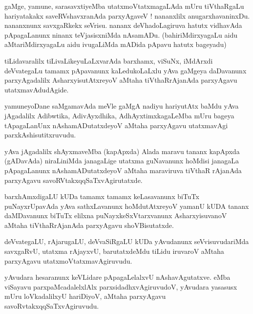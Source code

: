 \documentclass{article}
\begin{document}
\begin{mn}%
gaMge, yamune, sarasavxtiyeMba utatxmoVtatxmagaLAda mUru tiVthaRgaLu hariyatakakx 
saveRVshavxranAda parxyAgaveV ! nananxlilx anugarxhavaninxDu. nananxnunx savxgaRkekx 
seVrisu. nananx deVhadoLagiruva hatutx vidhavAda pApagaLanunx ninanx teVjasisxniMda 
nAsamADu. (bahiriMdirxyagaLu aidu aMtariMdirxyagaLu aidu ivugaLiMda mADida pApavu hatutx 
bageyadu)
\end{mn}

\begin{mn}%
tiLidavaralilx tiLivaLikeyuLaLxvarAda barxhamx, viSuNx, iMdArxdi deVvategaLu tamamx 
pApavanunx kaLedukoLaLxlu yAva gaMgeya daDavanunx parxyAgadalilx AsharxyisutAtxreyoV aMtaha 
tiVthaRrAjanAda parxyAgavu utatxmavAdudAgide.
\end{mn}

\begin{mn}%
yamuneyoDane saMgamavAda meVle gaMgA nadiyu hariyutAtx baMdu yAva jAgadalilx Adibwtika, 
AdivAyxdhika, AdhAyxtimxkagaLeMba mUru bageya tApagaLanUnx nAshamADutatxdeyoV aMtaha 
parxyAgavu utatxmavAgi parxkAshisutitxruvudu.
\end{mn}

\begin{mn}%
yAva jAgadalilx shAyxmaveMba (kapApxda) Alada maravu tananx kapApxda (gADavAda) niraLiniMda 
janagaLige utatxma guNavanunx hoMdisi janagaLa pApagaLanunx nAshamADutatxdeyoV aMtaha 
maraviruva tiVthaR rAjanAda parxyAgavu savoRVtakxqqSaTxvAgirutatxde.
\end{mn}

\begin{mn}%
barxhAmxdigaLU kUDa tamamx tamamx keLasavanunx biTuTx puNayxrUpavAda yAva sathxLavanunx 
hoMdutAtxreyoV yamanU kUDA tananx daMDavanunx biTuTx elilxna puNayxkeSxVtarxvanunx 
AsharxyisuvanoV aMtaha tiVthaRrAjanAda parxyAgavu shoVBisutatxde.
\end{mn}

\begin{mn}%
deVvategaLU, rAjarugaLU, deVvaSiRgaLU kUDa yAvudanunx seVvisuvudariMda savxgaRvU, utatxma 
rAjayxvU, barutatxdeMdu tiLidu iruvaroV aMtaha parxyAgavu utatxmoVtatxmavAgiruvudu.
\end{mn}

\begin{mn}%
yAvudara hesaranunx keVLidare pApagaLelalxvU nAshavAgutatxve. eMba viSayavu 
parxpaMcadalelxlAlx parxsidadhxvAgiruvudoV, yAvudara yasasusx mUru loVkadalilxyU hariDiyoV, 
aMtaha parxyAgavu savoRvtakxqqSaTxvAgiruvudu.
\end{mn}
\end{document}
